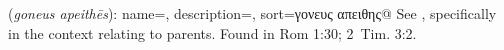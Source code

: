 \item[Disobedient to parents,]

(\textit{goneus apeithēs}):
{
    name=,
    description={},
    sort=γονευς απειθης@
}
See , specifically in the context relating to parents.
Found in Rom 1:30; 2~Tim. 3:2.
